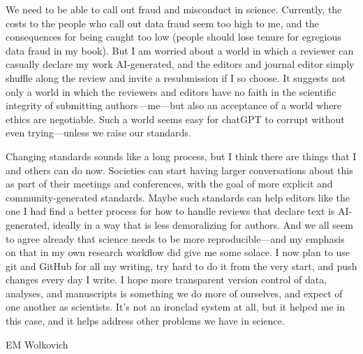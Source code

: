 \documentclass[11pt]{article}
\begin{document}
We need to be able to call out fraud and misconduct in science. Currently, the costs to the people who call out data fraud seem too high to me, and the consequences for being caught too low (people should lose tenure for egregious data fraud in my book). But I am worried about a world in which a reviewer can casually declare my work AI-generated, and the editors and journal editor simply shuffle along the review and invite a resubmission if I so choose. It suggests not only a world in which the reviewers and editors have no faith in the scientific integrity of submitting authors---me---but also an acceptance of a world where ethics are negotiable. Such a world seems easy for chatGPT to corrupt without even trying---unless we raise our standards. 

Changing standards sounds like a long process, but I think there are things that I and others can do now. Societies can start having larger conversations about this as part of their meetings and conferences, with the goal of more explicit and community-generated standards. Maybe such standards can help editors like the one I had find a better process for how to handle reviews that declare text is AI-generated, ideally in a way that is less demoralizing for authors. And we all seem to agree already that science needs to be more reproducible---and my emphasis on that in my own research workflow did give me some solace. I now plan to  use git and GitHub for all my writing, try hard to do it from the very start, and push changes every day I write. I hope more transparent version control of data, analyses, and manuscripts is something we do more of ourselves, and expect of one another as scientists. It's not an ironclad system at all, but it helped me in this case, and it helps address other problems we have in science.

EM Wolkovich
\end{document}
